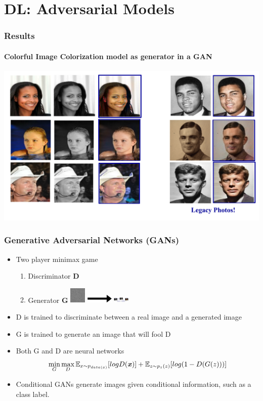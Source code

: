 \documentclass{beamer}
\begin{document}
\section*{DL: Adversarial Models}
\begin{frame}
\frametitle{\textbf{Results}}
\framesubtitle{\textbf{Colorful Image Colorization model as generator in a GAN}}
\includegraphics[width=\linewidth]{82.pdf}
\end{frame}




\begin{frame}
\frametitle{\textbf{Generative Adversarial Networks (GANs)}}
   \begin{itemize}
      \item Two player minimax game
	   \begin{enumerate}[$-$]
         \item Discriminator \textbf{D}
         \item Generator \textbf{G}
      \hspace{30mm}\includegraphics[width=0.3in]{noise} \hspace{2mm}\includegraphics[width=0.5in]{arrow} \hspace{1mm} \includegraphics[width=0.3in]{5}
	   \end{enumerate}
      \item D is trained to discriminate between a real image and a generated image
	   \item G is trained to generate an image that will fool D
	   \item Both G and D are neural networks
      \[\min\limits_{G}\max\limits_{D} \mathbb{E}_{x \sim p_{data(x)}} [logD(\textbf{\textit{x}})] + \mathbb{E}_{z \sim p_z(z)}[log(1 - D(G(z)))]\]
	   \item Conditional GANs generate images given conditional information, such as a class label.
   \end{itemize}
\end{frame}
\end{document}
